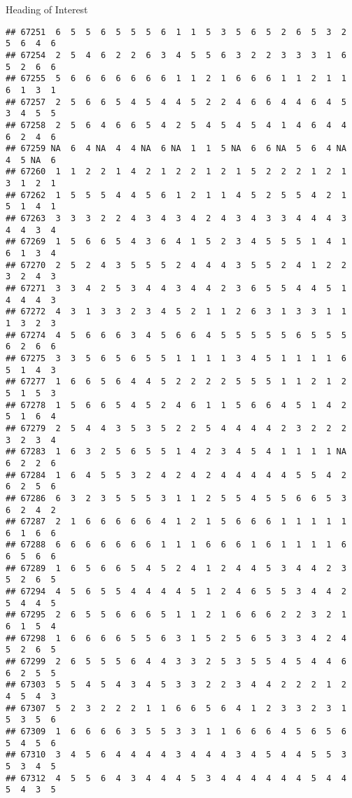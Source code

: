 \documentclass[
  ignorenonframetext,
]{beamer}
\begin{document}
\begin{frame}[fragile]{Heading of Interest}
\begin{verbatim}
## 67251  6  5  5  6  5  5  5  6  1  1  5  3  5  6  5  2  6  5  3  2  5  6  4  6
## 67254  2  5  4  6  2  2  6  3  4  5  5  6  3  2  2  3  3  3  1  6  5  2  6  6
## 67255  5  6  6  6  6  6  6  6  1  1  2  1  6  6  6  1  1  2  1  1  6  1  3  1
## 67257  2  5  6  6  5  4  5  4  4  5  2  2  4  6  6  4  4  6  4  5  3  4  5  5
## 67258  2  5  6  4  6  6  5  4  2  5  4  5  4  5  4  1  4  6  4  4  6  2  4  6
## 67259 NA  6  4 NA  4  4 NA  6 NA  1  1  5 NA  6  6 NA  5  6  4 NA  4  5 NA  6
## 67260  1  1  2  2  1  4  2  1  2  2  1  2  1  5  2  2  2  1  2  1  3  1  2  1
## 67262  1  5  5  5  4  4  5  6  1  2  1  1  4  5  2  5  5  4  2  1  5  1  4  1
## 67263  3  3  3  2  2  4  3  4  3  4  2  4  3  4  3  3  4  4  4  3  4  4  3  4
## 67269  1  5  6  6  5  4  3  6  4  1  5  2  3  4  5  5  5  1  4  1  6  1  3  4
## 67270  2  5  2  4  3  5  5  5  2  4  4  4  3  5  5  2  4  1  2  2  3  2  4  3
## 67271  3  3  4  2  5  3  4  4  3  4  4  2  3  6  5  5  4  4  5  1  4  4  4  3
## 67272  4  3  1  3  3  2  3  4  5  2  1  1  2  6  3  1  3  3  1  1  1  3  2  3
## 67274  4  5  6  6  6  3  4  5  6  6  4  5  5  5  5  5  6  5  5  5  6  2  6  6
## 67275  3  3  5  6  5  6  5  5  1  1  1  1  3  4  5  1  1  1  1  6  5  1  4  3
## 67277  1  6  6  5  6  4  4  5  2  2  2  2  5  5  5  1  1  2  1  2  5  1  5  3
## 67278  1  5  6  6  5  4  5  2  4  6  1  1  5  6  6  4  5  1  4  2  5  1  6  4
## 67279  2  5  4  4  3  5  3  5  2  2  5  4  4  4  4  2  3  2  2  2  3  2  3  4
## 67283  1  6  3  2  5  6  5  5  1  4  2  3  4  5  4  1  1  1  1 NA  6  2  2  6
## 67284  1  6  4  5  5  3  2  4  2  4  2  4  4  4  4  4  5  5  4  2  6  2  5  6
## 67286  6  3  2  3  5  5  5  3  1  1  2  5  5  4  5  5  6  6  5  3  6  2  4  2
## 67287  2  1  6  6  6  6  6  4  1  2  1  5  6  6  6  1  1  1  1  1  6  1  6  6
## 67288  6  6  6  6  6  6  6  1  1  1  6  6  6  1  6  1  1  1  1  6  6  5  6  6
## 67289  1  6  5  6  6  5  4  5  2  4  1  2  4  4  5  3  4  4  2  3  5  2  6  5
## 67294  4  5  6  5  5  4  4  4  4  5  1  2  4  6  5  5  3  4  4  2  5  4  4  5
## 67295  2  6  5  5  6  6  6  5  1  1  2  1  6  6  6  2  2  3  2  1  6  1  5  4
## 67298  1  6  6  6  6  5  5  6  3  1  5  2  5  6  5  3  3  4  2  4  5  2  6  5
## 67299  2  6  5  5  5  6  4  4  3  3  2  5  3  5  5  4  5  4  4  6  6  2  5  5
## 67303  5  5  4  5  4  3  4  5  3  3  2  2  3  4  4  2  2  2  1  2  4  5  4  3
## 67307  5  2  3  2  2  2  1  1  6  6  5  6  4  1  2  3  3  2  3  1  5  3  5  6
## 67309  1  6  6  6  6  3  5  5  3  3  1  1  6  6  6  4  5  6  5  6  5  4  5  6
## 67310  3  4  5  6  4  4  4  4  3  4  4  4  3  4  5  4  4  5  5  3  5  3  4  5
## 67312  4  5  5  6  4  3  4  4  4  5  3  4  4  4  4  4  4  5  4  4  5  4  3  5

\end{verbatim}
\end{frame}
\end{document}
